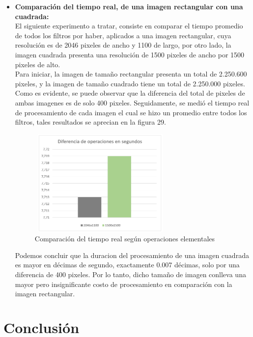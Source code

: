 \documentclass[journal]{IEEEtran}
\begin{document}
\begin{itemize}
\newpage
	\item{\bf Comparación del tiempo real, de una imagen rectangular con una cuadrada:} \\
	El siguiente experimento a tratar, consiste en comparar el tiempo promedio de todos los filtros por haber, aplicados a una imagen rectangular, cuya resolución es de 2046 pixeles de ancho y 1100 de largo, por otro lado, la imagen cuadrada presenta una resolución de 1500 pixeles de ancho por 1500 pixeles de alto. \\
	Para iniciar, la imagen de tamaño rectangular presenta un total de 2.250.600 pixeles, y la imagen de tamaño cuadrado tiene un total de 2.250.000 pixeles. Como es evidente, se puede observar que la diferencia del total de pixeles de ambas imagenes es de solo 400 pixeles. Seguidamente, se medió el tiempo real de procesamiento de cada imagen el cual se hizo un promedio entre todos los filtros, tales resultados se aprecian en la figura 29.
	
	\begin{figure}[h!]
		\centering
		\includegraphics[height= 150pt, width=200pt]{DiferenciaOperaciones.png}
		\caption{Comparación del tiempo real según operaciones elementales}
	\end{figure}

	Podemos concluir que la duracion del procesamiento de una imagen cuadrada es mayor en décimas de segundo, exactamente 0.007 décimas, solo por una diferencia de 400 pixeles. Por lo tanto, dicho tamaño de imagen conlleva una mayor pero insignificante costo de procesamiento en comparación con la imagen rectangular.
	

\end{itemize}

\newpage
\section{Conclusión}
\end{document}
